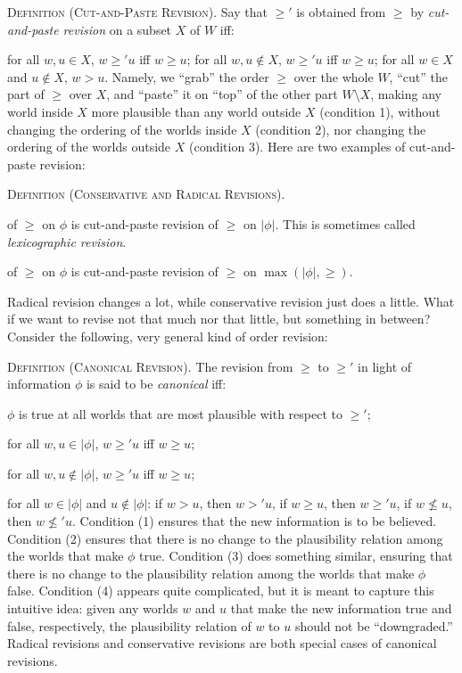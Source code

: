 	\xm \textsc{Definition (Cut-and-Paste Revision).} Say that $\ge'$ is obtained from $\ge$ by {\em cut-and-paste revision} on a subset $X$ of $W$ iff: \op

		\im[(1)] for all $w, u \in X$, $w \ge' u$ iff $w \ge u$;
		\im[(2)] for all $w, u \not\in X$, $w \ge' u$ iff $w \ge u$;
		\im[(3)] for all $w \in X$ and $u \not\in X$, $w > u$.
	\ed 
\ed Namely, we ``grab'' the order $\ge$ over the whole $W$, ``cut'' the part of $\ge$ over $X$, and ``paste'' it on ``top'' of the other part $W \setminus X$, making any world inside $X$ more plausible than any world outside $X$ (condition 1), without changing the ordering of the worlds inside $X$ (condition 2), nor changing the ordering of the worlds outside $X$ (condition 3). Here are two examples of cut-and-paste revision: \op

	\xm \textsc{Definition (Conservative and Radical Revisions).}

	 of $\ge$ on $\phi$ is cut-and-paste revision of $\ge$ on $|\phi|$. This is sometimes called {\em lexicographic revision}.

	 of $\ge$ on $\phi$ is cut-and-paste revision of $\ge$ on $\max(|\phi|, \ge)$.

\ed Radical revision changes a lot, while conservative revision just does a little. What if we want to revise not that much nor that little, but something in between? Consider the following, very general kind of order revision:\op

	\xm \textsc{Definition (Canonical Revision).} The revision from $\ge$ to $\ge'$ in light of information $\phi$ is said to be {\em canonical} iff: \op

	\im[(1)] $\phi$ is true at all worlds that are most plausible with respect to $\ge'$;

	\im[(2)] for all $w, u \in |\phi|$, $w \ge' u$ iff $w \ge u$;

	\im[(3)] for all $w, u \not\in |\phi|$, $w \ge' u$ iff $w \ge u$;

	\im[(4)] for all $w \in |\phi|$ and $u \not\in |\phi|$:
		\op
		\im if $w > u$, then $w >' u$,
		\im if $w \ge u$, then $w \ge' u$,
		\im if $w \not\le u$, then $w \not\le' u$.
		\ed
	\ed
\ed Condition (1) ensures that the new information is to be believed. Condition (2) ensures that there is no change to the plausibility relation among the worlds that make $\phi$ true. Condition (3) does something similar, ensuring that there is no change to the plausibility relation among the worlds that make $\phi$ false. Condition (4) appears quite complicated, but it is meant to capture this intuitive idea: given any worlds $w$ and $u$ that make the new information true and false, respectively, the plausibility relation of $w$ to $u$ should not be ``downgraded.'' Radical revisions and conservative revisions are both special cases of canonical revisions. 

